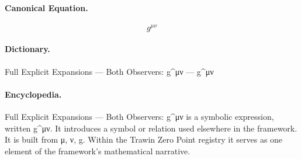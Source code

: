 \paragraph{Canonical Equation.}
\[
g^{\mu\nu}
\]

\paragraph{Dictionary.}
Full Explicit Expansions — Both Observers: g\textasciicircum{}μν — g\textasciicircum{}μν

\paragraph{Encyclopedia.}
Full Explicit Expansions — Both Observers: g\textasciicircum{}μν is a symbolic expression, written g\textasciicircum{}μν. It introduces a symbol or relation used elsewhere in the framework. It is built from μ, ν, g. Within the Trawin Zero Point registry it serves as one element of the framework's mathematical narrative.
